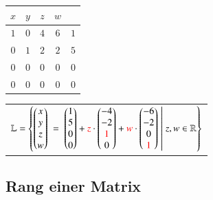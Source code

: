 \hfill
\begin{minipage}[t]{0.3\columnwidth}
	\renewcommand{\arraystretch}{1.4}
	\begin{tabular}[h]{|c c c c| c|}
		\hline
		$x$			& $y$		& $z$		& $w$		& 	\\
		\hline
		$1$			& $0$		& $4$		& $6$		& $1$	\\
		$0$			& $1$		& $2$		& $2$		& $5$	\\
		$0$			& $0$		& $0$		& $0$		& $0$	\\
		$0$			& $0$		& $0$		& $0$		& $0$	\\
		\hline
	\end{tabular}
	\renewcommand{\arraystretch}{1}
\end{minipage}
\hfill
\begin{minipage}[t]{0.65\columnwidth}
	\renewcommand{\arraystretch}{1.4}
	\begin{tabular}[h]{l}
		$\mathbb{L} =
		\left\{
		\begin{pmatrix}
		x\\
		y\\
		z\\
		w
		\end{pmatrix}
		\;=\;
		\begin{pmatrix}
		1\\
		5\\
		0\\
		0
		\end{pmatrix} + {\color{red}z} \cdot
		\begin{pmatrix}
		-4\\
		-2\\
		{\color{red}1}\\
		0
		\end{pmatrix} + {\color{red}w} \cdot
		\begin{pmatrix}
		-6\\
		-2\\
		0\\
		{\color{red}1}
		\end{pmatrix}
		\;\middle|\; z, w \in \mathbb{R}
		\right\}$
	\end{tabular}
	\renewcommand{\arraystretch}{1}
\end{minipage}


\subsection{Rang einer Matrix}
		
